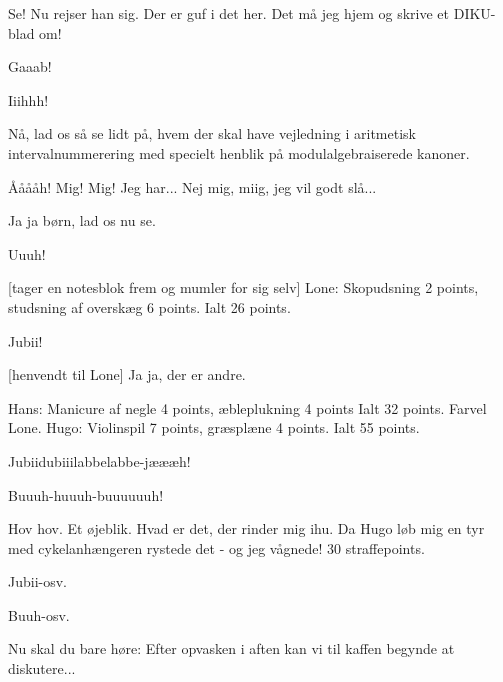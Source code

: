 \documentclass[a4paper,11pt]{article}
\begin{document}
\begin{sketch}
   Se! 
  Nu rejser han sig.  Der er guf i det her.  Det må jeg hjem og skrive
  et DIKU-blad om!


   Gaaab! 

   Iiihhh!

   Nå, lad os så se lidt på, hvem der skal have vejledning i
  aritmetisk intervalnummerering med specielt henblik på
  modulalgebraiserede kanoner.

   Ååååh!   Mig!  Mig!
  Jeg har... Nej mig, miig, jeg vil godt slå...

   Ja ja børn, lad os nu se.

   Uuuh!

  [tager en notesblok frem og mumler for sig selv] Lone:
  Skopudsning 2 points, studsning af overskæg 6 points. 
  Ialt 26 points.

   Jubii!

  [henvendt til Lone] Ja ja, der er andre.

   Hans: Manicure af negle 4 points, æbleplukning 4 points
   Ialt 32 points.  Farvel Lone.  Hugo:
  Violinspil 7 points, græsplæne 4 points.  Ialt 55
  points.

   Jubiidubiiilabbelabbe-jæææh!

   Buuuh-huuuh-buuuuuuh!

   Hov hov.  Et øjeblik.  Hvad er det, der rinder mig ihu.  Da
  Hugo løb mig en tyr med cykelanhængeren rystede det - og jeg
  vågnede!  30 straffepoints.

   Jubii-osv.

   Buuh-osv. 


   Nu skal du bare høre: Efter opvasken i aften kan vi til
  kaffen begynde at diskutere...

\end{sketch}
\end{document}
